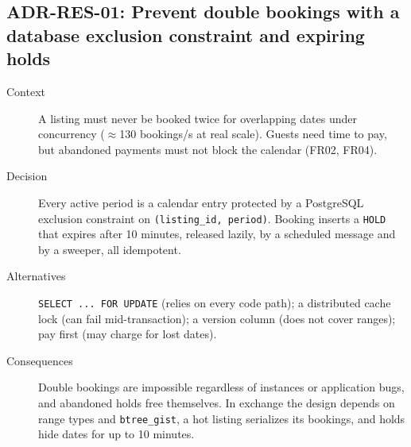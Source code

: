 \subsection{ADR-RES-01: Prevent double bookings with a database exclusion constraint and expiring holds}
\begin{description}
  \item[Context] A listing must never be booked twice for overlapping dates
    under concurrency ($\approx$130 bookings/s at real scale). Guests need
    time to pay, but abandoned payments must not block the calendar (FR02,
    FR04).
  \item[Decision] Every active period is a calendar entry protected by a
    PostgreSQL exclusion constraint on \texttt{(listing\_id, period)}. Booking
    inserts a \texttt{HOLD} that expires after 10 minutes, released lazily, by
    a scheduled message and by a sweeper, all idempotent.
  \item[Alternatives] \texttt{SELECT ... FOR UPDATE} (relies on every code
    path); a distributed cache lock (can fail mid-transaction); a version
    column (does not cover ranges); pay first (may charge for lost dates).
  \item[Consequences] Double bookings are impossible regardless of instances
    or application bugs, and abandoned holds free themselves. In exchange the
    design depends on range types and \texttt{btree\_gist}, a hot listing
    serializes its bookings, and holds hide dates for up to 10 minutes.
\end{description}

